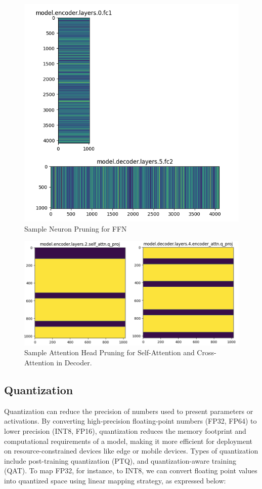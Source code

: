 \begin{figure}[h!]
    \centering
    \includegraphics[width=0.9\linewidth]{images/pruning1}
    \caption{Sample Neuron Pruning for FFN}
    \label{fig:neuron_pruning}
\end{figure}

\begin{figure}[h!]
    \centering
    \includegraphics[width=0.9\linewidth]{images/pruning2}
    \caption{Sample Attention Head Pruning for Self-Attention and Cross-Attention in Decoder.}
    \label{fig:attention_head_pruning}
\end{figure}


\subsection{Quantization}
Quantization can reduce the precision of numbers used to present parameters or activations.
By converting high-precision floating-point numbers (FP32, FP64) to lower precision (INT8, FP16),
quantization reduces the memory footprint and computational requirements of a model,
making it more efficient for deployment on resource-constrained devices like edge or mobile devices.
Types of quantization include post-training quantization (PTQ), and quantization-aware training (QAT).
To map FP32, for instance, to INT8, we can convert floating point values into quantized space using linear mapping strategy, as expressed below:


